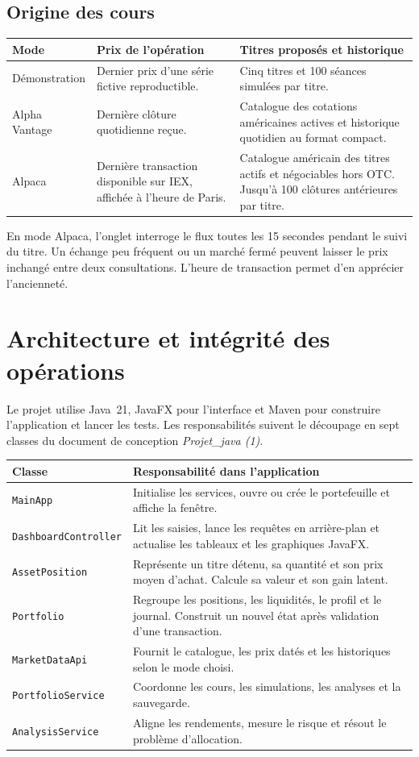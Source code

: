 \documentclass[11pt,a4paper]{article}
\newcommand{\code}[1]{\texttt{#1}}
\newcommand{\rubrique}[1]{\section*{\textcolor{foret}{#1}}}
\begin{document}
\subsection*{Origine des cours}
\begin{tabularx}{\linewidth}{@{}lYY@{}}
\toprule
Mode & Prix de l'opération & Titres proposés et historique \\
\midrule
Démonstration & Dernier prix d'une série fictive reproductible. & Cinq titres et 100 séances simulées par titre. \\
Alpha Vantage & Dernière clôture quotidienne reçue. & Catalogue des cotations américaines actives et historique quotidien au format compact. \\
Alpaca & Dernière transaction disponible sur IEX, affichée à l'heure de Paris. & Catalogue américain des titres actifs et négociables hors OTC. Jusqu'à 100 clôtures antérieures par titre. \\
\bottomrule
\end{tabularx}

En mode Alpaca, l'onglet interroge le flux toutes les 15 secondes pendant le suivi du titre. Un échange peu fréquent ou un marché fermé peuvent laisser le prix inchangé entre deux consultations. L'heure de transaction permet d'en apprécier l'ancienneté.

\newpage
\rubrique{Architecture et intégrité des opérations}

Le projet utilise Java~21, JavaFX pour l'interface et Maven pour construire l'application et lancer les tests. Les responsabilités suivent le découpage en sept classes du document de conception \emph{Projet\_java (1)}.

\begin{tabularx}{\linewidth}{@{}lY@{}}
\toprule
Classe & Responsabilité dans l'application \\
\midrule
\code{MainApp} & Initialise les services, ouvre ou crée le portefeuille et affiche la fenêtre. \\
\code{DashboardController} & Lit les saisies, lance les requêtes en arrière-plan et actualise les tableaux et les graphiques JavaFX. \\
\code{AssetPosition} & Représente un titre détenu, sa quantité et son prix moyen d'achat. Calcule sa valeur et son gain latent. \\
\code{Portfolio} & Regroupe les positions, les liquidités, le profil et le journal. Construit un nouvel état après validation d'une transaction. \\
\code{MarketDataApi} & Fournit le catalogue, les prix datés et les historiques selon le mode choisi. \\
\code{PortfolioService} & Coordonne les cours, les simulations, les analyses et la sauvegarde. \\
\code{AnalysisService} & Aligne les rendements, mesure le risque et résout le problème d'allocation. \\
\bottomrule
\end{tabularx}
\end{document}
